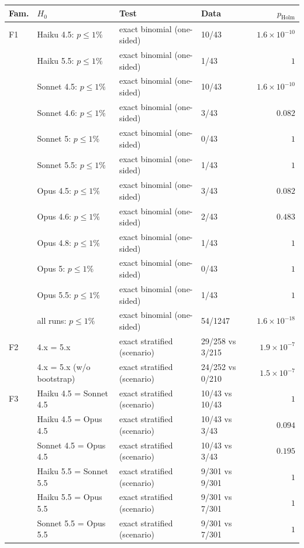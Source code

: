 \begin{longtable}{@{}lP{4.3cm}P{2.9cm}P{2.6cm}r@{}}
\toprule
Fam. & $H_0$ & Test & Data & $p_{\text{Holm}}$\\
\midrule\endhead
F1 & Haiku 4.5: $p\le1\%$ & exact binomial (one-sided) & 10/43 & $1.6\times 10^{-10}$\\
 & Haiku 5.5: $p\le1\%$ & exact binomial (one-sided) & 1/43 & $1$\\
 & Sonnet 4.5: $p\le1\%$ & exact binomial (one-sided) & 10/43 & $1.6\times 10^{-10}$\\
 & Sonnet 4.6: $p\le1\%$ & exact binomial (one-sided) & 3/43 & $0.082$\\
 & Sonnet 5: $p\le1\%$ & exact binomial (one-sided) & 0/43 & $1$\\
 & Sonnet 5.5: $p\le1\%$ & exact binomial (one-sided) & 1/43 & $1$\\
 & Opus 4.5: $p\le1\%$ & exact binomial (one-sided) & 3/43 & $0.082$\\
 & Opus 4.6: $p\le1\%$ & exact binomial (one-sided) & 2/43 & $0.483$\\
 & Opus 4.8: $p\le1\%$ & exact binomial (one-sided) & 1/43 & $1$\\
 & Opus 5: $p\le1\%$ & exact binomial (one-sided) & 0/43 & $1$\\
 & Opus 5.5: $p\le1\%$ & exact binomial (one-sided) & 1/43 & $1$\\
 & all runs: $p\le1\%$ & exact binomial (one-sided) & 54/1247 & $1.6\times 10^{-18}$\\
\addlinespace[2pt]
F2 & 4.x = 5.x & exact stratified (scenario) & 29/258 vs 3/215 & $1.9\times 10^{-7}$\\
 & 4.x = 5.x (w/o bootstrap) & exact stratified (scenario) & 24/252 vs 0/210 & $1.5\times 10^{-7}$\\
\addlinespace[2pt]
F3 & Haiku 4.5 = Sonnet 4.5 & exact stratified (scenario) & 10/43 vs 10/43 & $1$\\
 & Haiku 4.5 = Opus 4.5 & exact stratified (scenario) & 10/43 vs 3/43 & $0.094$\\
 & Sonnet 4.5 = Opus 4.5 & exact stratified (scenario) & 10/43 vs 3/43 & $0.195$\\
 & Haiku 5.5 = Sonnet 5.5 & exact stratified (scenario) & 9/301 vs 9/301 & $1$\\
 & Haiku 5.5 = Opus 5.5 & exact stratified (scenario) & 9/301 vs 7/301 & $1$\\
 & Sonnet 5.5 = Opus 5.5 & exact stratified (scenario) & 9/301 vs 7/301 & $1$\\

\end{longtable}
